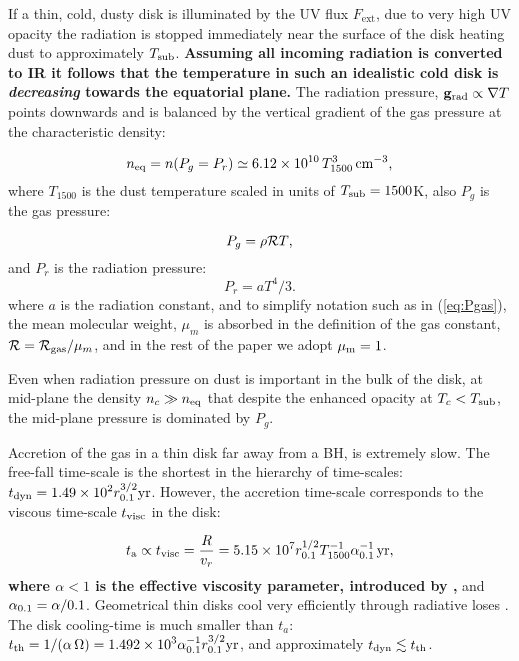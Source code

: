 \documentclass[12pt,english,preprint]{aastex}
\newcommand{\txt}{\text}
\newcommand{\mybf}{\bf}
\newcommand{\su}[2]{#1_{\rm #2}}
\newcommand{\Tsub}{ \su{T}{sub} }
\begin{document}
If a thin, cold, dusty disk is illuminated by the UV flux $F_\txt{ext}$, 
due to very high UV opacity the radiation is stopped immediately near the surface of the disk
heating dust to approximately $\Tsub$. {\mybf Assuming all incoming radiation is converted to IR it follows 
that the temperature in such an idealistic cold disk is {\it decreasing} towards the equatorial plane. }
The radiation pressure, ${\bf g}_\txt{rad}\propto \nabla T$ points downwards and 
is balanced by the vertical gradient of the gas pressure at the characteristic density: 

\begin{equation}
\su{n}{eq} =n(P_g=P_r) \simeq 6.12 \times 10^{10}\,T_{1500}^{3}\,{\rm cm^{-3}}\mbox{,}
\label{eq:densPgas=Prad}    
\end{equation}
where $T_{1500}$ is the dust temperature scaled in units of $\Tsub=1500$K, also $P_g$ is the gas pressure:

\begin{equation}
P_{g} = \rho{\cal R}T\mbox{,}\label{eq:Pgas}\\
\end{equation}
and $P_r$ is the radiation pressure:  
\begin{equation}
P_r  =  aT^{4}/3\mbox{.}\label{eq:Prad}
\end{equation}
where $a$ is the radiation constant, and to simplify notation such as in (\ref{eq:Pgas}), the mean molecular weight,
$\mu_m$ is absorbed in the definition of the gas constant,
${\cal R}=\su{{\cal R}}{gas}/\mu_m$, and in the rest of the
paper we adopt $\mu_{{\rm m}}=1$.



Even when radiation pressure on dust is important in the bulk of the disk, at mid-plane the density 
$n_c\gg \su{n}{eq}$ that despite the enhanced opacity at $T_{c}<\Tsub$, the mid-plane pressure is dominated by $P_{g}$.



Accretion of the gas in a thin disk far away from
a BH, is extremely slow. The free-fall time-scale is the shortest in the hierarchy of time-scales: 
$\displaystyle t_{{\rm dyn}}=1.49\times10^{2}r_{0.1}^{3/2}{\rm yr}$. 
However, the accretion time-scale corresponds to the viscous time-scale $t_{{\rm visc}}$ in the disk:

\begin{equation}
  t_{{\rm a}}\propto t_{{\rm visc}}=\frac{R}{v_{r}}=
  5.15\times10^{7}r_{0.1}^{1/2}T_{1500}^{-1}\alpha_{0.1}^{-1}\,\text{yr},\label{eq:t_visc}
\end{equation}
{\bf where $\alpha<1$ is the effective viscosity parameter, introduced
by \cite{ShakuraDiskModelGasAccretionRelativistic1972},
} and $\su{\alpha}{0.1} = \alpha/0.1$. 
Geometrical thin disks cool very efficiently through
radiative loses . The disk cooling-time is much smaller
than $t_{a}$: 
$\displaystyle t_{{\rm th}}=1/(\alpha\,\Omega)=1.492\times10^{3}\alpha_{0.1}^{-1}r_{0.1}^{3/2}{\rm yr}$,
and approximately $\su{t}{dyn}\lesssim \su{t}{th}$.
\end{document}
